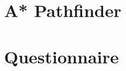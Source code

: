 \appendix
\appendixpage
\addappheadtotoc
\noappendicestocpagenum

\section{A* Pathfinder}\label{sec:astar}


\section{Questionnaire}\label{sec:question}
